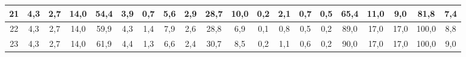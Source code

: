 \begin{sidewaystable}[]
\begin{tabular}{|c|c|c|c|c|c|c|c|c|c|c|c|c|c|c|c|c|c|c|c|}
    21 & 4,3                                              & 2,7                                              & 14,0                                             & 54,4                                             & 3,9                                              & 0,7                                              & 5,6                                              & 2,9                                              & 28,7                                             & 10,0                                             & 0,2                                              & 2,1                                              & 0,7                                              & 0,5                                              & 65,4                                            & 11,0                                            & 9,0                                             & 81,8                                            & 7,4                                             \\ \hline
    22 & 4,3                                              & 2,7                                              & 14,0                                             & 59,9                                             & 4,3                                              & 1,4                                              & 7,9                                              & 2,6                                              & 28,8                                             & 6,9                                              & 0,1                                              & 0,8                                              & 0,5                                              & 0,2                                              & 89,0                                            & 17,0                                            & 17,0                                            & 100,0                                           & 8,8                                             \\ \hline
    23 & 4,3                                              & 2,7                                              & 14,0                                             & 61,9                                             & 4,4                                              & 1,3                                              & 6,6                                              & 2,4                                              & 30,7                                             & 8,5                                              & 0,2                                              & 1,1                                              & 0,6                                              & 0,2                                              & 90,0                                            & 17,0                                            & 17,0                                            & 100,0                                           & 9,0                                             \\ \hline

\end{tabular}
\end{sidewaystable}
